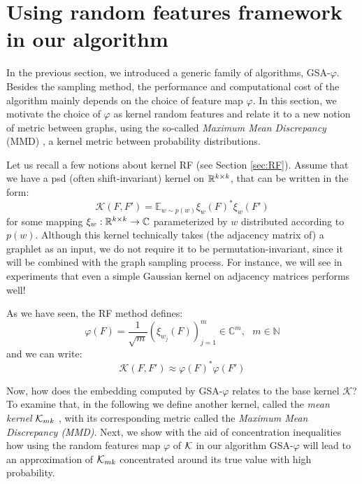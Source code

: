 \section{Using random features framework in our algorithm}

In the previous section, we introduced a generic family of algorithms, GSA-$\varphi$. Besides the sampling method, the performance and computational cost of the algorithm mainly depends on the choice of feature map $\varphi$. In this section, we motivate the choice of $\varphi$ as kernel random features  and relate it to a new notion of metric between graphs, using the so-called \emph{Maximum Mean Discrepancy} (MMD) \citep{gretton}, a kernel metric between probability distributions.

Let us recall a few notions about kernel RF (see Section \ref{sec:RF}). Assume that we have a psd (often shift-invariant) kernel on $\mathbb{R}^{k \times k}$, that can be written in the form:
\begin{equation}
\label{eq:random_features_3}
\mathcal{K}(F,F')= \mathbb{E}_{w \sim p(w)} \xi_w(F)^* \xi_w(F')
\end{equation}
for some mapping $\xi_w : \mathbb{R}^{k \times k} \to \mathbb{C}$ parameterized by $w$ distributed according to $p(w)$. Although this kernel technically takes (the adjacency matrix of) a graphlet as an input, we do not require it to be permutation-invariant, since it will be combined with the graph sampling process. For instance, we will see in experiments that even a simple Gaussian kernel on adjacency matrices performs well!

As we have seen, the RF method defines:
\begin{equation}\label{eq:RF}
\varphi(F) = \frac{1}{\sqrt{m}} ( \xi_{w_j}(F) )_{j=1}^m \in \mathbb{C}^m,~~~ m\in \mathbb{N}
\end{equation}
and we can write:
\[
\mathcal{K}(F,F')\approx \varphi(F)^*\varphi(F')
\]

Now, how does the embedding computed by GSA-$\varphi$ relates to the base kernel $\mathcal{K}$? To examine that, in the following we define another kernel, called the \emph{mean kernel} $\mathcal{K}_{mk}$ \citep{gretton}, with its corresponding metric called the \emph{Maximum Mean Discrepancy (MMD)}. Next, we show with the aid of concentration inequalities how using the random features map $\varphi$ of $\mathcal{K}$ in our algorithm GSA-$\varphi$ will lead to an approximation of $\mathcal{K}_{mk}$ concentrated around its true value with high probability.

